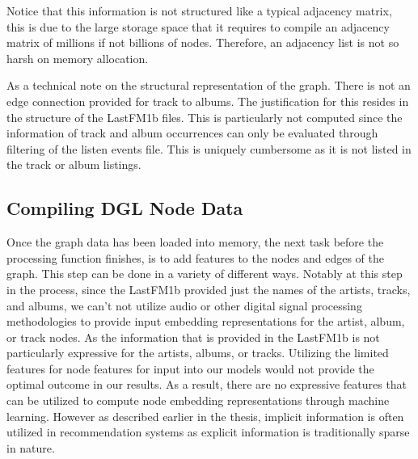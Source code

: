 




Notice that this information is not structured like a typical adjacency matrix, this is due to the large storage space that it requires to compile an adjacency matrix of millions if not billions of nodes. Therefore, an adjacency list is not so harsh on memory allocation.


As a technical note on the structural representation of the graph. There is not an edge connection provided for track to albums. The justification for this resides in the structure of the LastFM1b files.  This is particularly not computed since the information of track and album occurrences can only be evaluated through filtering of the listen events file. This is uniquely cumbersome as it is not listed in the track or album listings.

\subsection{Compiling DGL Node Data}
Once the graph data has been loaded into memory, the next task before the processing function finishes, is to add features to the nodes and edges of the graph. This step can be done in a variety of different ways. Notably at this step in the process, since the LastFM1b provided just the names of the artists, tracks, and albums, we can't not utilize audio or other digital signal processing methodologies to provide input embedding representations for the artist, album, or track nodes. As the information that is provided in the LastFM1b is not particularly expressive for the artists, albums, or tracks. Utilizing the limited features for node features for input into our models would not provide the optimal outcome in our results. As a result, there are no expressive features that can be utilized to compute node embedding representations through machine learning. However as described earlier in the thesis, implicit information is often utilized in recommendation systems as explicit information is traditionally sparse in nature.


